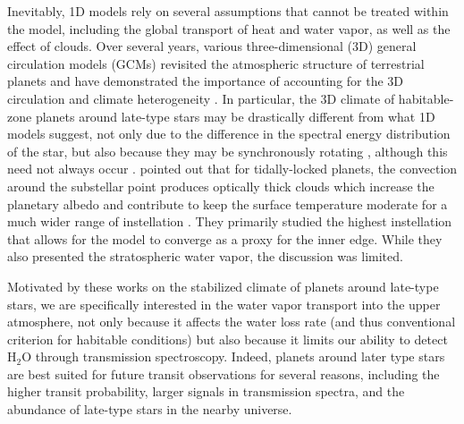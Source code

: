 \documentclass[11pt,numberedappendix,twocolappendix,]{emulateapj}
\def\water{H$_2$O }
\newcommand{\dsa}[1]{{\color{blue}#1}}
\begin{document}
Inevitably, 1D models rely on several assumptions that cannot be treated within the model, including the global transport of heat and water vapor, as well as the effect of clouds. 
Over several years, various \dsa{three-dimensional (3D)} general circulation models (GCMs) revisited the atmospheric structure of terrestrial planets and have demonstrated the importance of \dsa{accounting for the 3D} circulation and climate heterogeneity \citep[e.g.][]{Ishiwatari2002,Abe2011,Leconte2013a,Leconte2013b,Wolf2014,Wolf2015}. 
In particular, the \dsa{3D} climate of habitable-zone planets around late-type stars may be drastically different from what 1D models suggest, not only due to the difference in the spectral energy distribution of the star, but also because they may be synchronously rotating \citep{Dole1964, Kasting1993}, although this need not always occur \citep{Goldreich1966,Leconte2015}.  
%
\citet{Yang2013} pointed out that for tidally-locked planets, the convection around the \dsa{substellar} point produces optically thick clouds which increase the planetary albedo and contribute to keep the surface temperature moderate for a much wider range of instellation \citep[see also][]{Yang2014,Way2015,Kopparapu2016}. 
They primarily studied the highest instellation that allows for the model to converge as \dsa{a} proxy for the inner edge. 
While they also presented the stratospheric water vapor, the discussion was limited. 

Motivated by these works on the stabilized climate of planets around late-type stars, we are specifically interested in the water vapor transport into the upper atmosphere, not only because it affects the water loss rate (and thus conventional criterion for habitable conditions) but also because it limits our ability to detect \water through transmission spectroscopy. 
%
\dsa{Indeed, planets} around later type stars are best suited for future transit observations for several reasons, including the higher transit probability, larger signals in transmission spectra, and the abundance of late-type stars in the nearby universe. 
\end{document}
